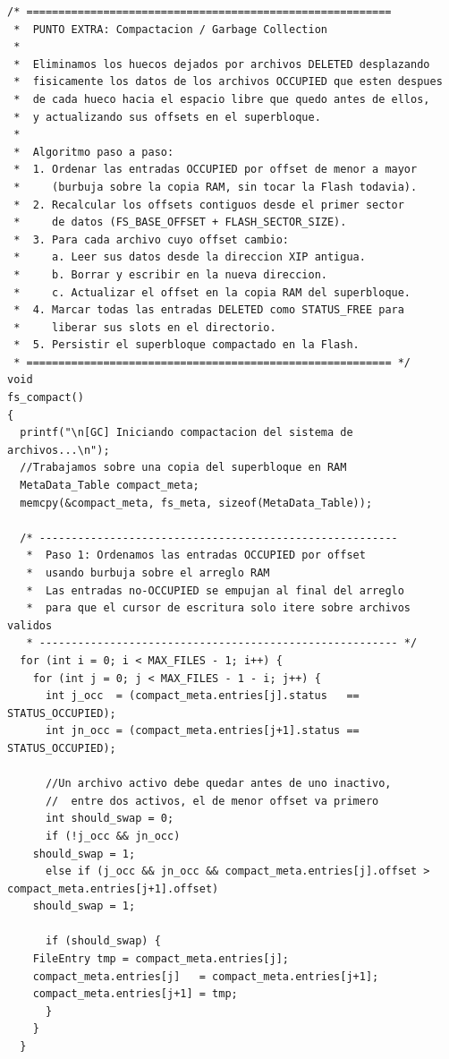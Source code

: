 \documentclass[12pt,letterpaper]{article}
\begin{document}
\begin{lstlisting}[style=modernc, caption={Implementación de \texttt{fs\_compact}: ordenamiento y relocalización}]
/* =========================================================
 *  PUNTO EXTRA: Compactacion / Garbage Collection
 *
 *  Eliminamos los huecos dejados por archivos DELETED desplazando
 *  fisicamente los datos de los archivos OCCUPIED que esten despues
 *  de cada hueco hacia el espacio libre que quedo antes de ellos,
 *  y actualizando sus offsets en el superbloque.
 *
 *  Algoritmo paso a paso:
 *  1. Ordenar las entradas OCCUPIED por offset de menor a mayor
 *     (burbuja sobre la copia RAM, sin tocar la Flash todavia).
 *  2. Recalcular los offsets contiguos desde el primer sector
 *     de datos (FS_BASE_OFFSET + FLASH_SECTOR_SIZE).
 *  3. Para cada archivo cuyo offset cambio:
 *     a. Leer sus datos desde la direccion XIP antigua.
 *     b. Borrar y escribir en la nueva direccion.
 *     c. Actualizar el offset en la copia RAM del superbloque.
 *  4. Marcar todas las entradas DELETED como STATUS_FREE para
 *     liberar sus slots en el directorio.
 *  5. Persistir el superbloque compactado en la Flash.
 * ========================================================= */
void
fs_compact()
{
  printf("\n[GC] Iniciando compactacion del sistema de archivos...\n");
  //Trabajamos sobre una copia del superbloque en RAM 
  MetaData_Table compact_meta;
  memcpy(&compact_meta, fs_meta, sizeof(MetaData_Table));
  
  /* --------------------------------------------------------
   *  Paso 1: Ordenamos las entradas OCCUPIED por offset
   *  usando burbuja sobre el arreglo RAM
   *  Las entradas no-OCCUPIED se empujan al final del arreglo
   *  para que el cursor de escritura solo itere sobre archivos validos
   * -------------------------------------------------------- */
  for (int i = 0; i < MAX_FILES - 1; i++) {
    for (int j = 0; j < MAX_FILES - 1 - i; j++) {
      int j_occ  = (compact_meta.entries[j].status   == STATUS_OCCUPIED);
      int jn_occ = (compact_meta.entries[j+1].status == STATUS_OCCUPIED);
      
      //Un archivo activo debe quedar antes de uno inactivo,
      //  entre dos activos, el de menor offset va primero
      int should_swap = 0;
      if (!j_occ && jn_occ)
	should_swap = 1;
      else if (j_occ && jn_occ && compact_meta.entries[j].offset > compact_meta.entries[j+1].offset)
	should_swap = 1;
      
      if (should_swap) {
	FileEntry tmp = compact_meta.entries[j];
	compact_meta.entries[j]   = compact_meta.entries[j+1];
	compact_meta.entries[j+1] = tmp;
      }
    }
  }
  

\end{lstlisting}
\end{document}

